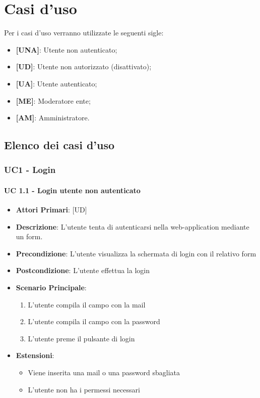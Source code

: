 \section{Casi d'uso}
	Per i casi d'uso verranno utilizzate le seguenti sigle:
	\begin{itemize}
		\item \textbf{[UNA]}: Utente non autenticato;
		\item \textbf{[UD]}: Utente non autorizzato (disattivato);
		\item \textbf{[UA]}: Utente autenticato;
		\item \textbf{[ME]}: Moderatore ente;
		\item \textbf{[AM]}: Amministratore.
	\end{itemize}
	\subsection{Elenco dei casi d'uso}

		\subsubsection{UC1 - Login}
			
			\paragraph{UC 1.1 - Login utente non autenticato}
			\begin{itemize}
				\item \textbf{Attori Primari}: [UD]
				\item \textbf{Descrizione}: L'utente tenta di autenticarsi nella web-application mediante un form.
				\item \textbf{Precondizione}: L'utente visualizza la schermata di login con il relativo form
				\item \textbf{Postcondizione}: L'utente effettua la login
				\item \textbf{Scenario Principale}:
				\begin{enumerate}
					\item{L'utente compila il campo con la mail}
					\item{L'utente compila il campo con la password}
					\item{L'utente preme il pulsante di login}
				\end{enumerate}	
				\item \textbf{Estensioni}:
					\begin{itemize}
						\item Viene inserita una mail o una password sbagliata
						\item L'utente non ha i permessi necessari 
					\end{itemize}

			\end{itemize}

